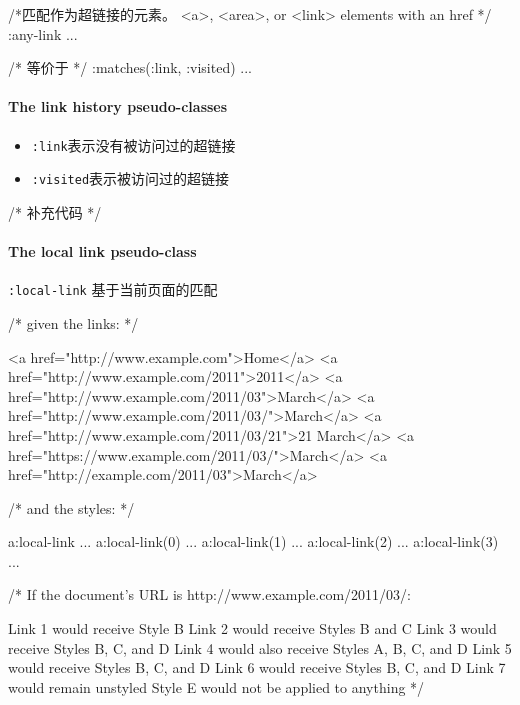 \begin{CSS}

/*匹配作为超链接的元素。 <a>, <area>, or <link> elements with an href */ 
:any-link { ... } 

/* 等价于 */
:matches(:link, :visited) { ... }

\end{CSS}


\paragraph{The link history pseudo-classes}

\begin{itemize}
\item \lstinline$:link$表示没有被访问过的超链接
\item \lstinline$:visited$表示被访问过的超链接

\end{itemize}

\begin{CSS}

/* 补充代码 */



\end{CSS}

\paragraph{The local link pseudo-class}

\lstinline$:local-link$ 基于当前页面的匹配

\begin{CSS}
/*
given the links:
*/

<a href="http://www.example.com">Home</a>
<a href="http://www.example.com/2011">2011</a>
<a href="http://www.example.com/2011/03">March</a>
<a href="http://www.example.com/2011/03/">March</a>
<a href="http://www.example.com/2011/03/21">21 March</a>
<a href="https://www.example.com/2011/03/">March</a>
<a href="http://example.com/2011/03">March</a>

/*
and the styles:
*/

a:local-link {...}
a:local-link(0) {...}
a:local-link(1) {...}
a:local-link(2) {...}
a:local-link(3) {...}

/*
If the document's URL is http://www.example.com/2011/03/:

Link 1 would receive Style B
Link 2 would receive Styles B and C
Link 3 would receive Styles B, C, and D
Link 4 would also receive Styles A, B, C, and D
Link 5 would receive Styles B, C, and D
Link 6 would receive Styles B, C, and D
Link 7 would remain unstyled
Style E would not be applied to anything
*/
\end{CSS}



